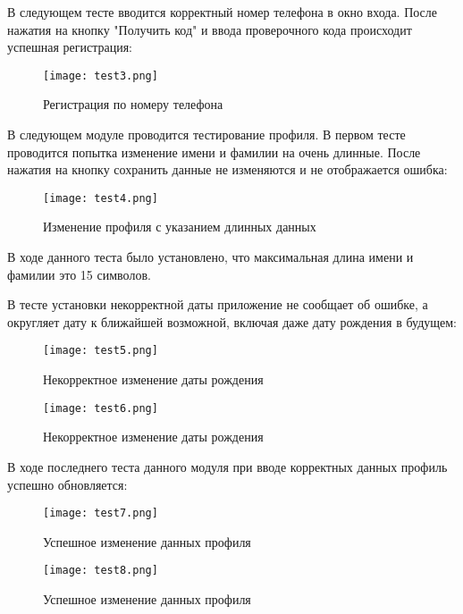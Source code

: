 \documentclass[12pt]{article}
\begin{document}
    В следующем тесте вводится корректный номер телефона в окно входа. После нажатия на кнопку "Получить код" и ввода проверочного кода происходит успешная регистрация:

    \begin{figure}[h]
        \texttt{[image: test3.png]}
        \centering
        \caption{Регистрация по номеру телефона}
    \end{figure}

    \newpage

    В следующем модуле проводится тестирование профиля. В первом тесте проводится попытка изменение имени и фамилии на очень длинные. После нажатия на кнопку сохранить данные не изменяются и не отображается ошибка:

    \begin{figure}[h]
        \texttt{[image: test4.png]}
        \centering
        \caption{Изменение профиля  с  указанием  длинных данных}
    \end{figure}

    В ходе данного теста было установлено, что максимальная длина имени и фамилии это 15 символов.

    \newpage

    В тесте установки некорректной даты приложение не сообщает об ошибке, а округляет дату к ближайшей возможной, включая даже дату рождения в будущем:

    \begin{figure}[h]
        \texttt{[image: test5.png]}
        \centering
        \caption{Некорректное изменение даты рождения}
    \end{figure}

    \begin{figure}[h]
        \texttt{[image: test6.png]}
        \centering
        \caption{Некорректное изменение даты рождения}
    \end{figure}

    \newpage

    В ходе последнего теста данного модуля при вводе корректных данных профиль успешно обновляется:

    \begin{figure}[h]
        \texttt{[image: test7.png]}
        \centering
        \caption{Успешное изменение   данных профиля}
    \end{figure}

    \begin{figure}[h]
        \texttt{[image: test8.png]}
        \centering
        \caption{Успешное изменение   данных профиля}
    \end{figure}
\end{document}
